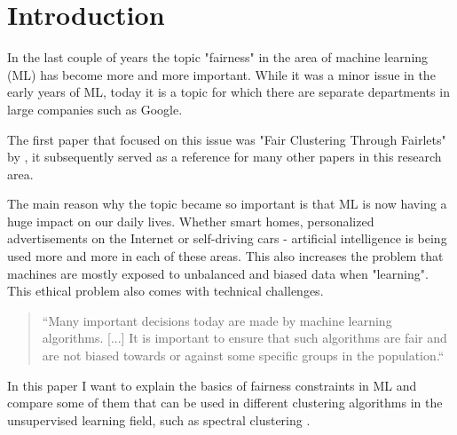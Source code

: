 \section{Introduction}

In the last couple of years the topic "fairness" in the area of machine learning (ML) has become more and more important. While it was a minor issue in the early years of ML, today it is a topic for which there are separate departments in large companies such as Google.

The first paper that focused on this issue was "Fair Clustering Through Fairlets" by \cite{Chierichetti2018}, it subsequently served as a reference for many other papers in this research area.

The main reason why the topic became so important is that ML is now having a huge impact on our daily lives. Whether smart homes, personalized advertisements on the Internet or self-driving cars - artificial intelligence is being used more and more in each of these areas. This also increases the problem that machines are mostly exposed to unbalanced and biased data when "learning". This ethical problem also comes with technical challenges.

\begin{quote}
    ``Many important decisions today are made by machine learning algorithms. [...] It is important to ensure that such algorithms are fair and are not biased towards or against some specific groups in the population.``
    
\autocite[1]{Bera2019}
\end{quote}


In this paper I want to explain the basics of fairness constraints in ML and compare some of them that can be used in different clustering algorithms in the unsupervised learning \autocite[]{Barlow1989} field, such as spectral clustering \autocite[]{Kleindessner2019}.
